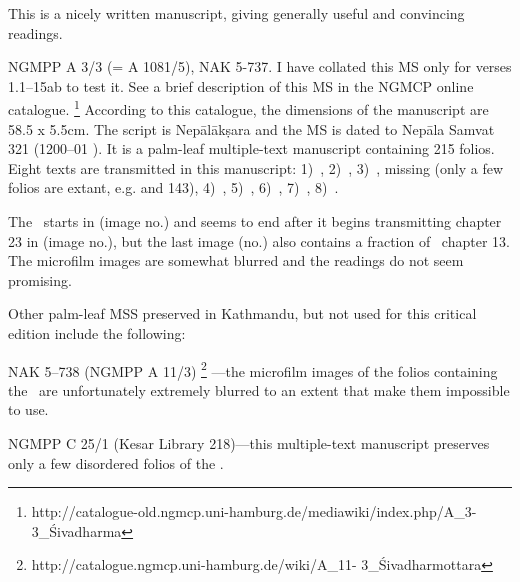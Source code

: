 This is a nicely written manuscript, giving generally useful and
convincing readings. 


NGMPP A 3/3 (= A 1081/5), NAK 5-737. I have collated 
this MS only for verses 1.1--15ab to test it. 
See a brief description of this MS in the NGMCP online
catalogue.%
	\footnote{http://catalogue-old.ngmcp.uni-hamburg.de/mediawiki/index.php/A\_3-3\_Śivadharma} 
According to this catalogue, the dimensions of the manuscript are
58.5 x 5.5cm. The script is Nepālākṣara and the MS is dated 
to Nepāla Samvat 321 (1200--01 \CE). It is a palm-leaf multiple-text manuscript containing 215 folios.
Eight texts are transmitted in this manuscript: 
1)~, 
2)~,
3)~, 
	missing (only a few folios are extant, e.g.  and 143), 
4)~, 
5)~,
6)~\Uums,
7)~,
8)~.

The \VSS\ starts in  (image no.) 
and seems to end after it begins transmitting chapter 23 
in  (image no.), but the last image 
(no.) also contains a fraction of \VSS\ chapter 13.
The microfilm images are somewhat blurred and the 
readings do not seem promising.

\bigskip
\bigskip

\noindent
Other palm-leaf MSS preserved in Kathmandu, but not used for
this critical edition include the following:

NAK 5--738 (NGMPP A 11/3)%
	\footnote{http://catalogue.ngmcp.uni-hamburg.de/wiki/A\_11- 3\_Śivadharmottara}%
---the microfilm images of the folios containing the \VSS\ are unfortunately extremely blurred to an extent that make them
impossible to use.


NGMPP C 25/1 (Kesar Library 218)---this multiple-text manuscript
preserves only a few disordered folios of the \VSS.

